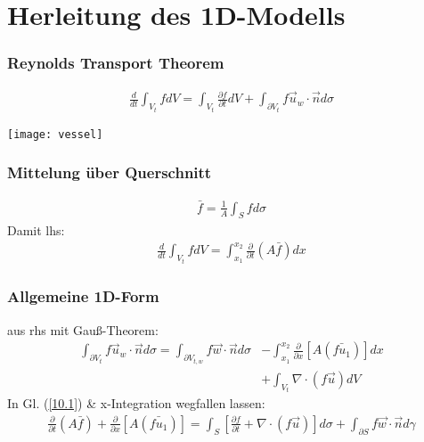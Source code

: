 \section{Herleitung des 1D-Modells}




\begin{frame}\frametitle{Reynolds Transport Theorem}

  \begin{align}
    \frac{d}{dt} \int_{V_t} f dV = \int_{V_t} \frac{\partial f}{\partial t}dV + \int_{\partial V_t} f \vec u_w \cdot \vec n d\sigma \label{10.1} %
  \end{align}

  \begin{center}
      \texttt{[image: vessel]}
  \end{center}

\end{frame}


\begin{frame}\frametitle{Mittelung über Querschnitt}


  \begin{align}
    \bar f = \frac{1}{A} \int_S f d\sigma %
  \end{align}
  Damit lhs:
  \begin{align}
    \frac{d}{dt} \int_{V_t} f dV = \int_{x_1}^{x_2} \frac{\partial}{\partial t} (A \bar f) dx %
  \end{align}

\end{frame}


\begin{frame}\frametitle{Allgemeine 1D-Form}
  aus rhs mit Gauß-Theorem:
  \begin{equation}
  \begin{aligned}
    \int_{\partial V_t} f \vec u_w \cdot \vec n d\sigma = \int_{\partial V_{t, w}} f \vec w \cdot \vec n d\sigma &- \int_{x_1}^{x_2} \frac{\partial}{\partial x} \left[  A (\bar{f u_1}) \right] dx \\&+ \int_{V_t} \nabla \cdot (f \vec u) dV
  \end{aligned} %
\end{equation} %
In Gl. (\ref{10.1}) \& x-Integration wegfallen lassen:
\begin{align}
\boxed{
\frac{\partial}{\partial t} (A \bar f) + \frac{\partial}{\partial x} \left[ A (\bar{f u_1}) \right] = \int_S \left[ \frac{\partial f}{\partial t}
+ \nabla \cdot (f\vec u) \right] d \sigma
+ \int_{\partial S} f \vec w \cdot \vec n d \gamma} %
\end{align}
\end{frame}

